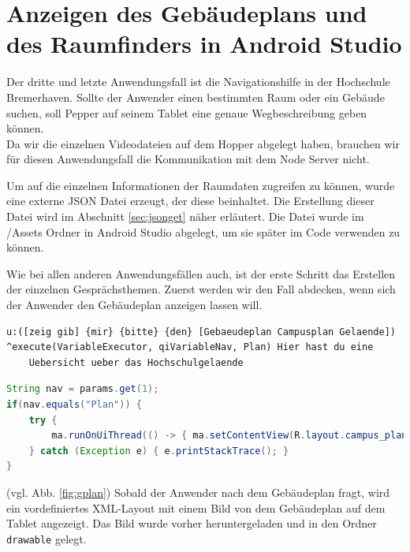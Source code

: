 \section{Anzeigen des Gebäudeplans und des Raumfinders in Android Studio}

Der dritte und letzte Anwendungsfall ist die Navigationshilfe in der Hochschule Bremerhaven. Sollte der Anwender einen bestimmten Raum oder ein Gebäude suchen, soll Pepper auf seinem Tablet eine genaue Wegbeschreibung geben können. 
\\
Da wir die einzelnen Videodateien auf dem Hopper abgelegt haben, brauchen wir für diesen Anwendungsfall die Kommunikation mit dem Node Server nicht. 

Um auf die einzelnen Informationen der Raumdaten zugreifen zu können, wurde eine externe JSON Datei erzeugt, der diese beinhaltet. Die Erstellung dieser Datei wird im Abschnitt \ref{sec:jsonget} näher erläutert. Die Datei wurde im /Assets Ordner in Android Studio abgelegt, um sie später im Code verwenden zu können. 

Wie bei allen anderen Anwendungsfällen auch, ist der erste Schritt das Erstellen der einzelnen Gesprächsthemen. 
Zuerst werden wir den Fall abdecken, wenn sich der Anwender den Gebäudeplan anzeigen lassen will.\\

\begin{lstlisting}[caption={Topic - Raumfinder}]
u:([zeig gib] {mir} {bitte} {den} [Gebaeudeplan Campusplan Gelaende])
^execute(VariableExecutor, qiVariableNav, Plan) Hier hast du eine 
    Uebersicht ueber das Hochschulgelaende
\end{lstlisting}


\begin{lstlisting}[language=Java, caption={Anzeigen des Gebäudeplans}]
String nav = params.get(1);
if(nav.equals("Plan")) {
    try {
        ma.runOnUiThread(() -> { ma.setContentView(R.layout.campus_plan); });
    } catch (Exception e) { e.printStackTrace(); }
}
\end{lstlisting}

(vgl. Abb. \ref{fig:gplan}) Sobald der Anwender nach dem Gebäudeplan fragt, wird ein vordefiniertes XML-Layout mit einem Bild von dem 
Gebäudeplan auf dem Tablet angezeigt. Das Bild wurde vorher heruntergeladen und in den Ordner 
\verb|drawable| gelegt.\\

